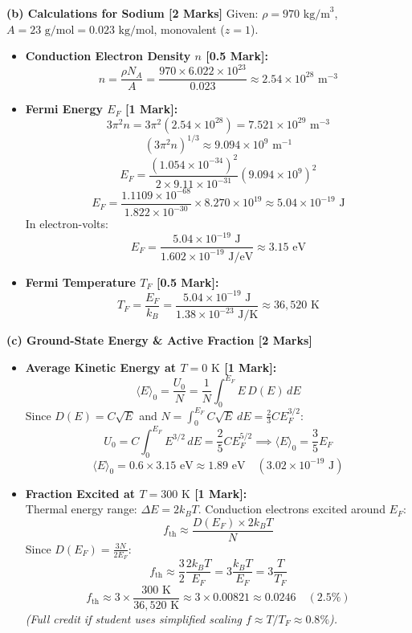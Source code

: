 \documentclass[10pt,a4paper,twocolumn]{article}
\begin{document}
\textbf{(b) Calculations for Sodium [2 Marks]}
Given: $\rho = 970\text{ kg/m}^3$, $A = 23\text{ g/mol} = 0.023\text{ kg/mol}$, monovalent ($z=1$).
\begin{itemize}
    \item \textbf{Conduction Electron Density $n$ [0.5 Mark]:}
    $$n = \frac{\rho N_A}{A} = \frac{970 \times 6.022 \times 10^{23}}{0.023} \approx 2.54 \times 10^{28}\text{ m}^{-3}$$
    \item \textbf{Fermi Energy $E_F$ [1 Mark]:}
    $$3\pi^2 n = 3\pi^2 (2.54 \times 10^{28}) = 7.521 \times 10^{29}\text{ m}^{-3}$$
    $$(3\pi^2 n)^{1/3} \approx 9.094 \times 10^9\text{ m}^{-1}$$
    $$E_F = \frac{(1.054 \times 10^{-34})^2}{2 \times 9.11 \times 10^{-31}} (9.094 \times 10^9)^2$$
    $$E_F = \frac{1.1109 \times 10^{-68}}{1.822 \times 10^{-30}} \times 8.270 \times 10^{19} \approx 5.04 \times 10^{-19}\text{ J}$$
    In electron-volts:
    $$E_F = \frac{5.04 \times 10^{-19}\text{ J}}{1.602 \times 10^{-19}\text{ J/eV}} \approx 3.15\text{ eV}$$
    \item \textbf{Fermi Temperature $T_F$ [0.5 Mark]:}
    $$T_F = \frac{E_F}{k_B} = \frac{5.04 \times 10^{-19}\text{ J}}{1.38 \times 10^{-23}\text{ J/K}} \approx 36,520\text{ K}$$
\end{itemize}

\textbf{(c) Ground-State Energy \& Active Fraction [2 Marks]}
\begin{itemize}
    \item \textbf{Average Kinetic Energy at $T = 0\text{ K}$ [1 Mark]:}
    $$\langle E \rangle_0 = \frac{U_0}{N} = \frac{1}{N}\int_0^{E_F} E \, D(E)\, dE$$
    Since $D(E) = C\sqrt{E}$ and $N = \int_0^{E_F} C\sqrt{E}\,dE = \frac{2}{3} C E_F^{3/2}$:
    $$U_0 = C \int_0^{E_F} E^{3/2}\,dE = \frac{2}{5} C E_F^{5/2} \implies \langle E \rangle_0 = \frac{3}{5} E_F$$
    $$\langle E \rangle_0 = 0.6 \times 3.15\text{ eV} \approx 1.89\text{ eV} \quad (3.02 \times 10^{-19}\text{ J})$$
    \item \textbf{Fraction Excited at $T = 300\text{ K}$ [1 Mark]:}\\
    Thermal energy range: $\Delta E = 2 k_B T$. Conduction electrons excited around $E_F$:
    $$f_{\text{th}} \approx \frac{D(E_F) \times 2 k_B T}{N}$$
    Since $D(E_F) = \frac{3N}{2E_F}$:
    $$f_{\text{th}} \approx \frac{3}{2}\frac{2 k_B T}{E_F} = 3 \frac{k_B T}{E_F} = 3 \frac{T}{T_F}$$
    $$f_{\text{th}} \approx 3 \times \frac{300\text{ K}}{36,520\text{ K}} \approx 3 \times 0.00821 \approx 0.0246 \quad (2.5\%)$$
    \textit{(Full credit if student uses simplified scaling $f \approx T/T_F \approx 0.8\%$).}
\end{itemize}
\end{document}
